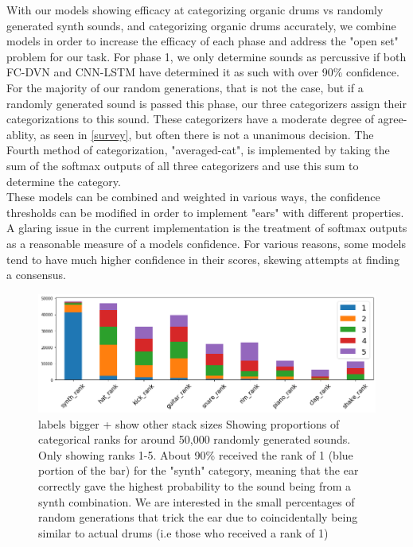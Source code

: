 \documentclass{nime-alternate} %
\begin{document}
With our models showing efficacy at categorizing organic drums vs randomly generated synth sounds, and categorizing organic drums accurately, we combine models in order to increase the efficacy of each phase and address the "open set" problem for our task. For phase 1, we only determine sounds as percussive if both FC-DVN and CNN-LSTM have determined it as such with over 90\% confidence. For the majority of our random generations, that is not the case, but if a randomly generated sound is passed this phase, our three categorizers assign their categorizations to this sound. These categorizers have a moderate degree of agree-ablity, as seen in \ref{survey}, but often there is not a unanimous decision. The Fourth method of categorization, "averaged-cat", is implemented by taking the sum of the softmax outputs of all three categorizers and use this sum to determine the category. \\
These models can be combined and weighted in various ways, the confidence thresholds can be modified in order to implement "ears" with different properties. A glaring issue in the current implementation is the treatment of softmax outputs as a reasonable measure of a models confidence. For various reasons, some models tend to have much higher confidence in their scores, skewing attempts at finding a consensus. 

%
\begin{figure}[H]
\centering
\includegraphics[width=1\linewidth]{images/random_ranks.png}
\caption{\colorbox{green!=40}{labels bigger + show other stack sizes} Showing proportions of categorical ranks for around 50,000 randomly generated sounds. Only showing ranks 1-5. About 90\% received the rank of 1 (blue portion of the bar) for the "synth" category, meaning that the ear correctly gave the highest probability to the sound being from a synth combination. We are interested in the small percentages of random generations that trick the ear due to coincidentally being similar to actual drums (i.e those who received a rank of 1) }
\label{fig:rank portions}
\end{figure}
\end{document}
